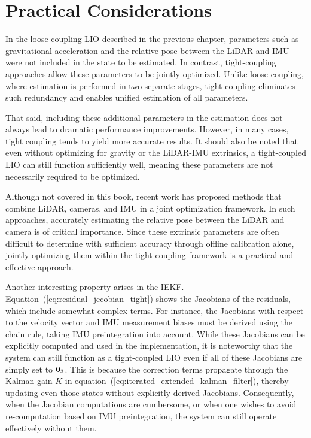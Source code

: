 \section{Practical Considerations}

In the loose-coupling LIO described in the previous chapter, parameters such as gravitational acceleration and the relative pose between the LiDAR and IMU were not included in the state to be estimated.
In contrast, tight-coupling approaches allow these parameters to be jointly optimized.
Unlike loose coupling, where estimation is performed in two separate stages, tight coupling eliminates such redundancy and enables unified estimation of all parameters.

That said, including these additional parameters in the estimation does not always lead to dramatic performance improvements.
However, in many cases, tight coupling tends to yield more accurate results.
It should also be noted that even without optimizing for gravity or the LiDAR-IMU extrinsics, a tight-coupled LIO can still function sufficiently well, meaning these parameters are not necessarily required to be optimized.

Although not covered in this book, recent work has proposed methods that combine LiDAR, cameras, and IMU in a joint optimization framework.
In such approaches, accurately estimating the relative pose between the LiDAR and camera is of critical importance.
Since these extrinsic parameters are often difficult to determine with sufficient accuracy through offline calibration alone, jointly optimizing them within the tight-coupling framework is a practical and effective approach.

Another interesting property arises in the IEKF.
Equation~(\ref{eq:residual_jecobian_tight}) shows the Jacobians of the residuals, which include somewhat complex terms.
For instance, the Jacobians with respect to the velocity vector and IMU measurement biases must be derived using the chain rule, taking IMU preintegration into account.
While these Jacobians can be explicitly computed and used in the implementation, it is noteworthy that the system can still function as a tight-coupled LIO even if all of these Jacobians are simply set to ${\bf 0}_{3}$.
This is because the correction terms propagate through the Kalman gain $K$ in equation~(\ref{eq:iterated_extended_kalman_filter}), thereby updating even those states without explicitly derived Jacobians.
Consequently, when the Jacobian computations are cumbersome, or when one wishes to avoid re-computation based on IMU preintegration, the system can still operate effectively without them.

